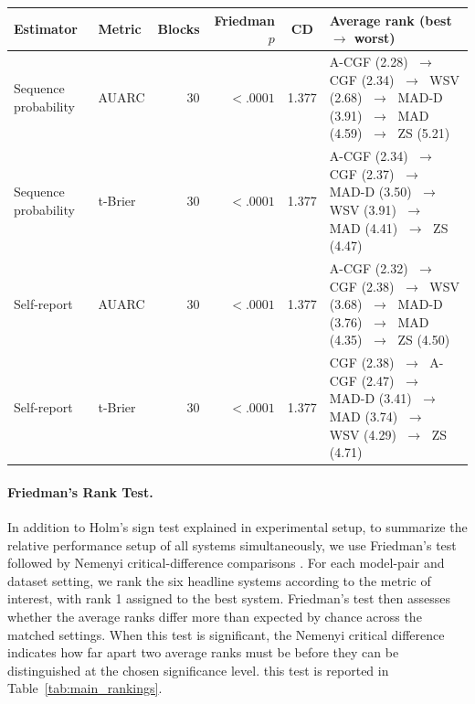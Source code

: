 \vspace{5mm}
\noindent
\begin{minipage}{\textwidth}
\centering
\small
\begin{threeparttable}
\begin{tabular}{llrrcp{}}
\toprule
Estimator & Metric & Blocks & Friedman $p$ & CD & Average rank (best $\to$ worst) \\
\midrule
Sequence probability & AUARC & 30 & $<.0001$ & 1.377 & A-CGF (2.28) $\;\to\;$ CGF (2.34) $\;\to\;$ WSV (2.68) $\;\to\;$ MAD-D (3.91) $\;\to\;$ MAD (4.59) $\;\to\;$ ZS (5.21) \\
\midrule
Sequence probability & t-Brier & 30 & $<.0001$ & 1.377 & A-CGF (2.34) $\;\to\;$ CGF (2.37) $\;\to\;$ MAD-D (3.50) $\;\to\;$ WSV (3.91) $\;\to\;$ MAD (4.41) $\;\to\;$ ZS (4.47) \\
\midrule
Self-report & AUARC & 30 & $<.0001$ & 1.377 & A-CGF (2.32) $\;\to\;$ CGF (2.38) $\;\to\;$ WSV (3.68) $\;\to\;$ MAD-D (3.76) $\;\to\;$ MAD (4.35) $\;\to\;$ ZS (4.50) \\
\midrule
Self-report & t-Brier & 30 & $<.0001$ & 1.377 & CGF (2.38) $\;\to\;$ A-CGF (2.47) $\;\to\;$ MAD-D (3.41) $\;\to\;$ MAD (3.74) $\;\to\;$ WSV (4.29) $\;\to\;$ ZS (4.71) \\
\bottomrule
\end{tabular}
\end{threeparttable}
\label{tab:main_rankings}
\end{minipage}
\vspace{5mm}

\paragraph{Friedman's Rank Test.}
In addition to Holm's sign test explained in experimental setup, to summarize the relative performance setup of all systems simultaneously, we use Friedman's test followed by Nemenyi critical-difference comparisons \citep{friedman1937ranks,nemenyi1963distribution,demsar2006statistical}. For each model-pair and dataset setting, we rank the six headline systems according to the metric of interest, with rank 1 assigned to the best system. Friedman’s test then assesses whether the average ranks differ more than expected by chance across the matched settings. When this test is significant, the Nemenyi critical difference indicates how far apart two average ranks must be before they can be distinguished at the chosen significance level. this test is reported in Table~\ref{tab:main_rankings}.

\FloatBarrier
\clearpage
